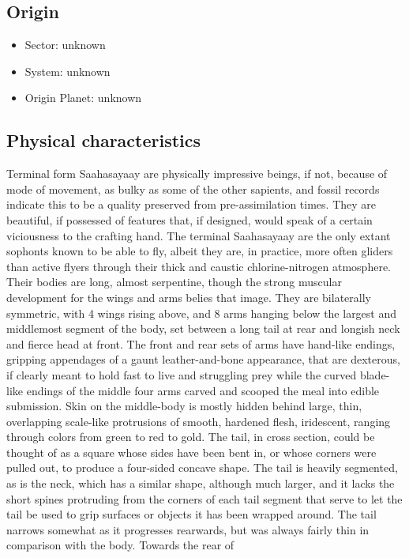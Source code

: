 \subsection{Origin}
\begin{itemize}
\item Sector: unknown
\item System: unknown
\item Origin Planet: unknown
\end{itemize}

\subsection{Physical characteristics}
Terminal form Saahasayaay are physically impressive beings, if not,
because of mode of movement, as bulky as some of the other sapients,
and fossil records indicate this to be a quality preserved from
pre-assimilation times. They are beautiful, if possessed of features
that, if designed, would speak of a certain viciousness to the
crafting hand. The terminal Saahasayaay are the only extant sophonts
known to be able to fly, albeit they are, in practice, more often
gliders than active flyers through their thick and caustic
chlorine-nitrogen atmosphere. Their bodies are long, almost
serpentine, though the strong muscular development for the wings and
arms belies that image. They are bilaterally symmetric, with 4 wings
rising above, and 8 arms hanging below the largest and middlemost
segment of the body, set between a long tail at rear and longish neck
and fierce head at front. The front and rear sets of arms have
hand-like endings, gripping appendages of a gaunt leather-and-bone
appearance, that are dexterous, if clearly meant to hold fast to live
and struggling prey while the curved blade-like endings of the middle
four arms carved and scooped the meal into edible submission. Skin on
the middle-body is mostly hidden behind large, thin, overlapping
scale-like protrusions of smooth, hardened flesh, iridescent, ranging
through colors from green to red to gold. The tail, in cross section,
could be thought of as a square whose sides have been bent in, or
whose corners were pulled out, to produce a four-sided concave
shape. The tail is heavily segmented, as is the neck, which has a
similar shape, although much larger, and it lacks the short spines
protruding from the corners of each tail segment that serve to let the
tail be used to grip surfaces or objects it has been wrapped
around. The tail narrows somewhat as it progresses rearwards, but was
always fairly thin in comparison with the body. Towards the rear of
